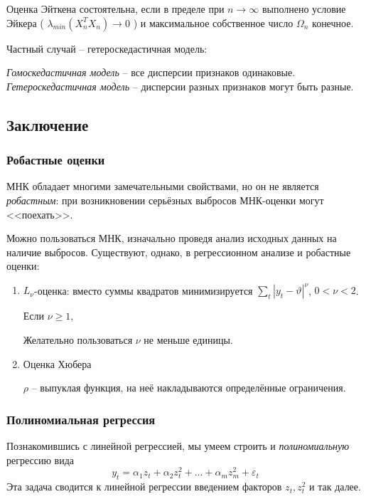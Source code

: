 \documentclass[main.tex]{subfiles}
\begin{document}
\begin{theorem}
    Оценка Эйткена состоятельна, если в пределе при $ n \to \infty $ выполнено условие Эйкера ( $ \lambda_{min}(X^T_nX_n) \to 0 $ ) и максимальное собственное число $ \Omega_n $ конечное.
\end{theorem}

Частный случай -- гетероскедастичная модель:

\begin{leftbar}
    \emph{Гомоскедастичная модель} -- все дисперсии признаков одинаковые.
   \emph{Гетероскедастичная модель} -- дисперсии разных признаков могут быть разные.
\end{leftbar}

\subsection{Заключение}

\subsubsection{Робастные оценки}
МНК обладает многими замечательными свойствами, но он не является \emph{робастным}: при возникновении серьёзных выбросов МНК-оценки могут <<поехать>>.

Можно пользоваться МНК, изначально проведя анализ исходных данных на наличие выбросов.
Существуют, однако, в регрессионном анализе и робастные оценки:

\begin{enumerate}[noitemsep]
    \item $ L_\nu $-оценка: вместо суммы квадратов минимизируется $ \sum_t |y_t - \vartheta|^\nu $, $ 0 < \nu < 2 $.

    Если $ \nu \ge 1 $,

    Желательно пользоваться $ \nu $ не меньше единицы.
    \item Оценка Хюбера

    $ \rho $ -- выпуклая функция, на неё накладываются определённые ограничения.
\end{enumerate}

\subsubsection{ Полиномиальная регрессия }
Познакомившись с линейной регрессией, мы умеем строить и \emph{полиномиальную} регрессию вида
\[ y_t = \alpha_1 z_t + \alpha_2 z_t^2 + ... + \alpha_m z_m^2 + \varepsilon_t \]
Эта задача сводится к линейной регрессии введением факторов $ z_t, z_t^2 $ и так далее.
\end{document}
